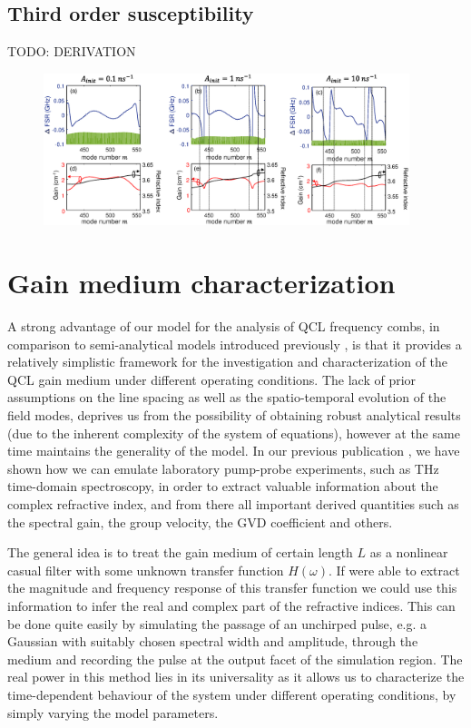 \documentclass[journal]{IEEEtran}
\begin{document}
\subsection{Third order susceptibility}
TODO: DERIVATION


\begin{figure}[h!]
	\centering
	\includegraphics[width=0.95\textwidth]{IMGS/FSR_variation}
\end{figure}

\section{Gain medium characterization}

A strong advantage of our model for the analysis of QCL frequency combs, in comparison to semi-analytical models introduced previously \cite{khurgin2014coherent,villares2015quantum}, is that it provides a relatively simplistic framework for the investigation and characterization of the QCL gain medium under different operating conditions. The lack of prior assumptions on the line spacing as well as the spatio-temporal evolution of the field modes, deprives us from the possibility of obtaining robust analytical results (due to the inherent complexity of the system of equations), however at the same time maintains the generality of the model. In our previous publication \cite{petz2016}, we have shown how we can emulate laboratory pump-probe experiments, such as THz time-domain spectroscopy, in order to extract valuable information about the complex refractive index, and from there all important derived quantities such as the spectral gain, the group velocity, the GVD coefficient and others. 

The general idea is to treat the gain medium of certain length $L$ as a nonlinear casual filter with some unknown transfer function $H(\omega)$. If were able to extract the magnitude and frequency response of this transfer function we could use this information to infer the real and complex part of the refractive indices. This can be done quite easily by simulating the passage of an unchirped pulse, e.g. a Gaussian with suitably chosen spectral width and amplitude, through the medium and recording the pulse at the output facet of the simulation region. The real power in this method lies in its universality as it allows us to characterize the time-dependent behaviour of the system under different operating conditions, by simply varying the model parameters.
\end{document}
